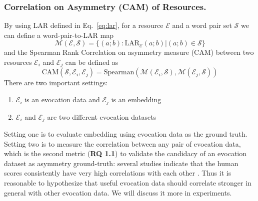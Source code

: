 \documentclass[letterpaper]{article} %
\begin{document}
\subsubsection{Correlation on Asymmetry (CAM) of Resources.}
By using LAR defined in Eq.~\ref{eq:lar}, for a resource $\mathcal{E}$ and a word pair set $\mathcal{S}$ we can define a word-pair-to-LAR map 
\begin{equation}
\label{eq:m}
\mathcal{M}(\mathcal{E},\mathcal{S}) = \{(a;b):\text{LAR}_\mathcal{E}(a;b) | (a;b) \in \mathcal{S}\}
\end{equation}
and the Spearman Rank Correlation on asymmetry measure (CAM) between two resources $\mathcal{E}_i$ and $\mathcal{E}_j$ can be defined as
\begin{equation}
    \text{CAM}(\mathcal{S}, \mathcal{E}_i, \mathcal{E}_j)=\text{Spearman}(\mathcal{M}(\mathcal{E}_i,\mathcal{S}), \mathcal{M}(\mathcal{E}_j,\mathcal{S}))
    \label{eq:cam}
\end{equation} 
There are two important settings: 
\begin{enumerate}
    \item $\mathcal{E}_i$ is an evocation data and $\mathcal{E}_j$ is an embedding
    \item $\mathcal{E}_i$ and $\mathcal{E}_j$ are two different evocation datasets 
\end{enumerate}
Setting one is to evaluate embedding using evocation data as the ground truth. Setting two is to measure the correlation between any pair of evocation data, which is the second metric (\textbf{RQ 1.1}) to validate the candidacy of an evocation dataset as asymmetry ground-truth: several studies indicate that the human scores consistently have very high correlations with each other \cite{miller1991contextual,Resnik:1995:UIC:1625855.1625914}. Thus it is reasonable to hypothesize that useful evocation data should correlate stronger in general with other evocation data. We will discuss it more in experiments.
\end{document}
